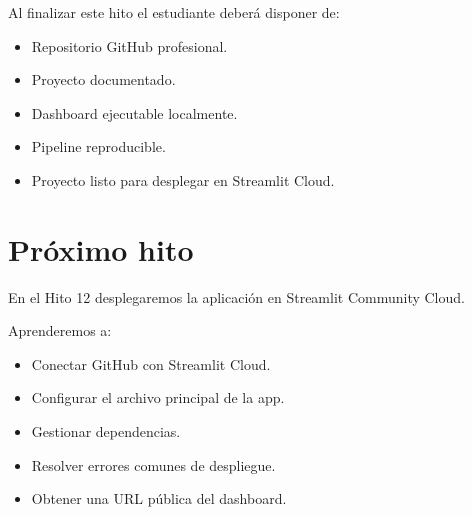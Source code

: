 Al finalizar este hito el estudiante deberá disponer de:

\begin{itemize}
\item Repositorio GitHub profesional.
\item Proyecto documentado.
\item Dashboard ejecutable localmente.
\item Pipeline reproducible.
\item Proyecto listo para desplegar en Streamlit Cloud.
\end{itemize}

\section{Próximo hito}

En el Hito 12 desplegaremos la aplicación en Streamlit Community Cloud.

Aprenderemos a:

\begin{itemize}
\item Conectar GitHub con Streamlit Cloud.
\item Configurar el archivo principal de la app.
\item Gestionar dependencias.
\item Resolver errores comunes de despliegue.
\item Obtener una URL pública del dashboard.
\end{itemize}
